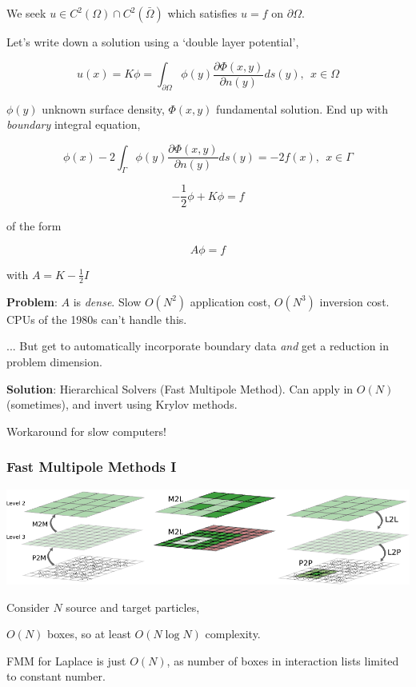 \begin{frame}

    We seek $u \in C^2(\Omega) \cap C^2(\bar{\Omega})$ which satisfies $u=f$ on $\partial \Omega$.

    Let's write down a solution using a `double layer potential',

    $$u(x) = K \phi = \int_{\partial \Omega} \phi(y) \frac{\partial \Phi(x, y)}{\partial n (y)} ds(y), \> \> x \in \Omega$$

    $\phi(y)$ unknown surface density, $\Phi(x, y)$ fundamental solution. End up with \textit{boundary} integral equation,

    $$  \phi(x)  - 2 \int_\Gamma \phi(y) \frac{\partial \Phi(x, y)}{\partial n(y)} ds(y) = -2 f(x), \> \> x \in \Gamma $$

    $$ -\frac{1}{2} \phi + K \phi = f $$

    of the form

    $$ A\phi = f $$

    with $A = K - \frac{1}{2} I$


\end{frame}

\begin{frame}
    \textbf{Problem}: $A$ is \textit{dense}. Slow $O(N^2)$ application cost, $O(N^3)$ inversion cost. CPUs of the 1980s can't handle this.

    ...    But get to automatically incorporate boundary data \textit{and} get a reduction in problem dimension.

\end{frame}

\begin{frame}
    \textbf{Solution}: Hierarchical Solvers (Fast Multipole Method). Can apply in $O(N)$ (sometimes), and invert using Krylov methods.

    Workaround for slow computers!
\end{frame}


\begin{frame}
    \frametitle{Fast Multipole Methods I }
    \includegraphics[width=\linewidth]{assets/algorithm.pdf}

    Consider $N$ source and target particles,

    \begin{list}{-}{ }
        \item $O(N)$ boxes, so at least $O(N \log N)$ complexity.
    \end{list}

    FMM for Laplace is just $O(N)$, as number of boxes in interaction lists limited to constant number.

\end{frame}

